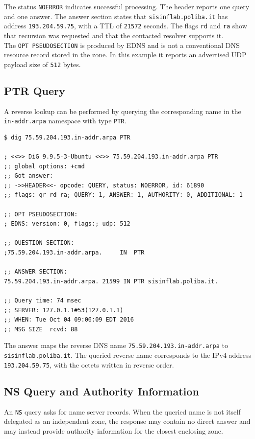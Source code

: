 \documentclass{scrbook}
\begin{document}
	The status \texttt{NOERROR} indicates successful processing. The header reports one query and one answer. The answer section states that \texttt{sisinflab.poliba.it} has address \texttt{193.204.59.75}, with a TTL of \texttt{21572} seconds. The flags \texttt{rd} and \texttt{ra} show that recursion was requested and that the contacted resolver supports it.\\
	
	The \texttt{OPT PSEUDOSECTION} is produced by EDNS and is not a conventional DNS resource record stored in the zone. In this example it reports an advertised UDP payload size of \texttt{512} bytes.
	
	\newpage
	\subsection{PTR Query}
	
	A reverse lookup can be performed by querying the corresponding name in the \texttt{in-addr.arpa} namespace with type \texttt{PTR}.
	
	\begin{lstlisting}
$ dig 75.59.204.193.in-addr.arpa PTR

; <<>> DiG 9.9.5-3-Ubuntu <<>> 75.59.204.193.in-addr.arpa PTR
;; global options: +cmd
;; Got answer:
;; ->>HEADER<<- opcode: QUERY, status: NOERROR, id: 61890
;; flags: qr rd ra; QUERY: 1, ANSWER: 1, AUTHORITY: 0, ADDITIONAL: 1

;; OPT PSEUDOSECTION:
; EDNS: version: 0, flags:; udp: 512

;; QUESTION SECTION:
;75.59.204.193.in-addr.arpa.     IN  PTR

;; ANSWER SECTION:
75.59.204.193.in-addr.arpa. 21599 IN PTR sisinflab.poliba.it.

;; Query time: 74 msec
;; SERVER: 127.0.1.1#53(127.0.1.1)
;; WHEN: Tue Oct 04 09:06:09 EDT 2016
;; MSG SIZE  rcvd: 88
	\end{lstlisting}
	
	The answer maps the reverse DNS name \texttt{75.59.204.193.in-addr.arpa} to \texttt{sisinflab.poliba.it}. The queried reverse name corresponds to the IPv4 address \texttt{193.204.59.75}, with the octets written in reverse order.
	
	\subsection{NS Query and Authority Information}
	
	An \texttt{NS} query asks for name server records. When the queried name is not itself delegated as an independent zone, the response may contain no direct answer and may instead provide authority information for the closest enclosing zone.
	
\end{document}
